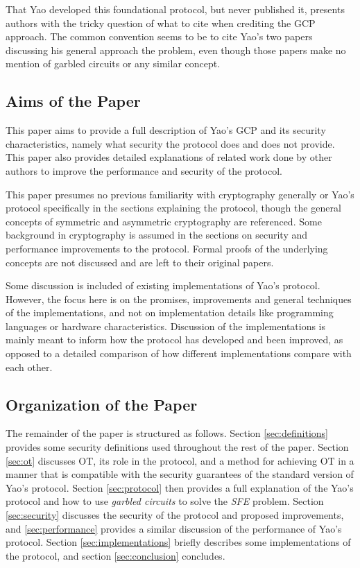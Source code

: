 That Yao developed this foundational protocol, but never published it, presents authors with the tricky question of what to cite when crediting the \ac{GCP} approach.  The common convention seems to be to cite Yao's two papers discussing his general approach the problem, even though those papers make no mention of garbled circuits or any similar concept.

\subsection{Aims of the Paper}

This paper aims to provide a full description of Yao's \ac{GCP} and its security characteristics, namely what security the protocol does and does not provide.  This paper also provides detailed explanations of related work done by other authors to improve the performance and security of the protocol.

This paper presumes no previous familiarity with cryptography generally or Yao's protocol specifically in the sections explaining the protocol, though the general  concepts of symmetric and asymmetric cryptography are referenced.  Some background in cryptography is assumed in the sections on security and performance improvements  to the protocol.  Formal proofs of the underlying concepts are not discussed and are left to their original papers.

Some discussion is included of existing implementations of Yao's protocol. However, the focus here is on the promises, improvements and general techniques of the implementations, and not on implementation details like programming languages or hardware characteristics. Discussion of the implementations is mainly meant to inform how the protocol has developed and been improved, as opposed to a detailed comparison of how different implementations compare with each other.
\
\subsection{Organization of the Paper}

The remainder of the paper is structured as follows. Section \ref{sec:definitions} provides some security definitions used throughout the rest of the paper. Section \ref{sec:ot} discusses \ac{OT}, its role in the protocol, and a method for achieving \ac{OT} in a manner that is compatible with the security guarantees of the standard version of Yao's protocol.  Section \ref{sec:protocol} then provides a full explanation of the Yao's protocol and how to use \emph{garbled circuits} to solve the \emph{SFE} problem. Section \ref{sec:security} discusses the security of the protocol and proposed improvements, and \ref{sec:performance} provides a similar discussion of the performance of Yao's protocol. Section \ref{sec:implementations} briefly describes some implementations of the protocol, and section \ref{sec:conclusion} concludes.
